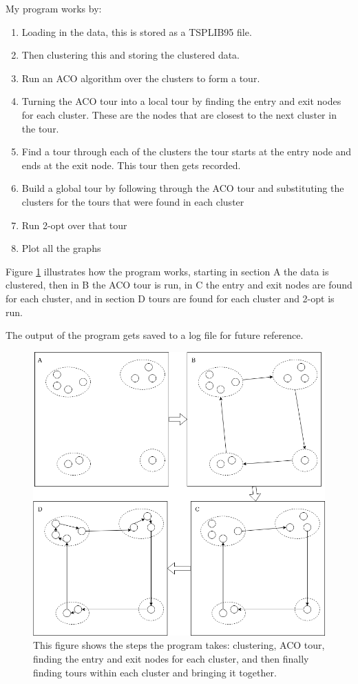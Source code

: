 My program works by:
\begin{enumerate}
    \item Loading in the data, this is stored as a TSPLIB95 file.
    \item Then clustering this and storing the clustered data.
    \item Run an ACO algorithm over the clusters to form a tour.
    \item Turning the ACO tour into a local tour by finding the entry and exit nodes for each cluster. These are the nodes that are closest to the next cluster in the tour.
    \item Find a tour through each of the clusters the tour starts at the entry node and ends at the exit node. This tour then gets recorded.
    \item Build a global tour by following through the ACO tour and substituting the clusters for the tours that were found in each cluster
    \item Run 2-opt over that tour
    \item Plot all the graphs
\end{enumerate}

Figure \ref{fig:run_diagram} illustrates how the program works, starting in section A the data is clustered, then in B the ACO tour is run, in C the entry and exit nodes are found for each cluster, and in section D tours are found for each cluster and 2-opt is run.

The output of the program gets saved to a log file for future reference.

\begin{figure}
    \centering
    \includegraphics[width=\textwidth]{figures/diagram_design_how.png}
    \caption{This figure shows the steps the program takes: clustering, ACO tour, finding the entry and exit nodes for each cluster, and then finally finding tours within each cluster and bringing it together.}
    \label{fig:run_diagram}
\end{figure}

